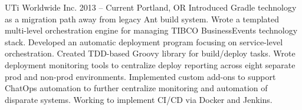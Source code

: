 {UTi Worldwide Inc.}
{2013 -- Current}
{Portland, OR}
{Introduced Gradle technology as a migration path away from legacy Ant build system. Wrote a templated multi-level orchestration engine for managing TIBCO BusinessEvents technology stack. Developed an automatic deployment program focusing on service-level orchestration. Created TDD-based Groovy library for build/deploy tasks. Wrote deployment monitoring tools to centralize deploy reporting across eight separate prod and non-prod environments. Implemented custom add-ons to support ChatOps automation to further centralize monitoring and automation of disparate systems. Working to implement CI/CD via Docker and Jenkins.}
